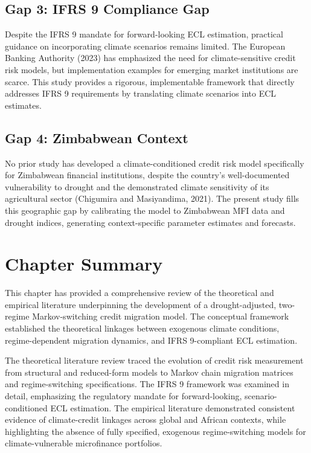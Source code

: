 \documentclass[12pt,a4paper]{article}
\begin{document}
\subsection{Gap 3: IFRS 9 Compliance Gap}

Despite the IFRS 9 mandate for forward-looking ECL estimation, practical guidance on incorporating climate scenarios remains limited. The European Banking Authority (2023) has emphasized the need for climate-sensitive credit risk models, but implementation examples for emerging market institutions are scarce. This study provides a rigorous, implementable framework that directly addresses IFRS 9 requirements by translating climate scenarios into ECL estimates.

\subsection{Gap 4: Zimbabwean Context}

No prior study has developed a climate-conditioned credit risk model specifically for Zimbabwean financial institutions, despite the country's well-documented vulnerability to drought and the demonstrated climate sensitivity of its agricultural sector (Chigumira and Masiyandima, 2021). The present study fills this geographic gap by calibrating the model to Zimbabwean MFI data and drought indices, generating context-specific parameter estimates and forecasts.

\section{Chapter Summary}

This chapter has provided a comprehensive review of the theoretical and empirical literature underpinning the development of a drought-adjusted, two-regime Markov-switching credit migration model. The conceptual framework established the theoretical linkages between exogenous climate conditions, regime-dependent migration dynamics, and IFRS 9-compliant ECL estimation.

The theoretical literature review traced the evolution of credit risk measurement from structural and reduced-form models to Markov chain migration matrices and regime-switching specifications. The IFRS 9 framework was examined in detail, emphasizing the regulatory mandate for forward-looking, scenario-conditioned ECL estimation. The empirical literature demonstrated consistent evidence of climate-credit linkages across global and African contexts, while highlighting the absence of fully specified, exogenous regime-switching models for climate-vulnerable microfinance portfolios.
\end{document}
